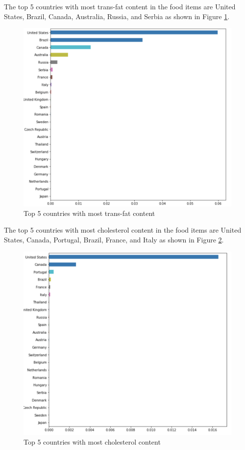 \documentclass[sigconf]{acmart}
\begin{document}
    
The top 5 countries with most trans-fat content in the food items are United States, Brazil, Canada, Australia, Russia, and Serbia as shown in Figure \ref{fig:Fig10}. \\
    
\begin{figure}
\includegraphics[width=1.0\columnwidth]{images/fig10.png}
\caption{Top 5 countries with most trans-fat content \cite{code-base}}
\label{fig:Fig10}
\end{figure}
        
The top 5 countries with most cholesterol content in the food items are United States, Canada, Portugal, Brazil, France, and Italy as shown in Figure \ref{fig:Fig11}. \\
    
\begin{figure}
\includegraphics[width=1.0\columnwidth]{images/fig11.png}
\caption{Top 5 countries with most cholesterol content \cite{code-base}}
\label{fig:Fig11}
\end{figure}
\end{document}
